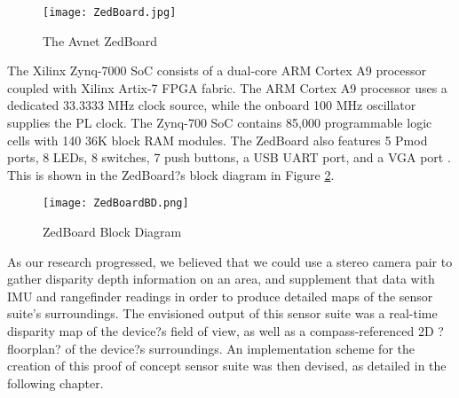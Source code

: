 \begin{figure}[H]
	\centerline{\texttt{[image: ZedBoard.jpg]}}
	\caption{The Avnet ZedBoard \cite{zedboard_photo}}
	\label{zedboard_pic}
\end{figure}

The Xilinx Zynq-7000 SoC consists of a dual-core ARM Cortex A9 processor coupled with Xilinx Artix-7 FPGA fabric. The ARM Cortex A9 processor uses a dedicated 33.3333 MHz clock source, while the onboard 100 MHz oscillator supplies the PL clock. The Zynq-700 SoC contains 85,000 programmable logic cells with 140 36K block RAM modules. The ZedBoard also features 5 Pmod ports, 8 LEDs, 8 switches, 7 push buttons, a USB UART port, and a VGA port \cite{zedboard_datasheet}. This is shown in the ZedBoard?s block diagram in Figure \ref{zedboardbd}.

\begin{figure}[H]
	\centerline{\texttt{[image: ZedBoardBD.png]}}
	\caption{ZedBoard Block Diagram \cite{zedboard_datasheet}}
	\label{zedboardbd}
\end{figure}
\par
As our research progressed, we believed that we could use a stereo camera pair to gather disparity depth information on an area, and supplement that data with IMU and rangefinder readings in order to produce detailed maps of the sensor suite's surroundings. The envisioned output of this sensor suite was a real-time disparity map of the device?s field of view, as well as a compass-referenced 2D ?floorplan? of the device?s surroundings. An implementation scheme for the creation of this proof of concept sensor suite was then devised, as detailed in the following chapter.